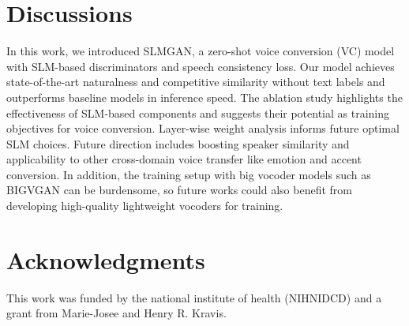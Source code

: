 \documentclass{article}
\let\oldbibitem\bibitem
\newcommand{\newfootnotesize}{\fontsize{8.5pt}{9pt}\selectfont}
\renewcommand{\bibitem}[1]{\oldbibitem{#1}\newfootnotesize}
\begin{document}
\begin{sloppy}
\section{Discussions}
\label{sec:discussions}
In this work, we introduced SLMGAN, a zero-shot voice conversion (VC) model with SLM-based discriminators and speech consistency loss. Our model achieves state-of-the-art naturalness and competitive similarity without text labels and outperforms baseline models in inference speed. The ablation study highlights the effectiveness of SLM-based components and suggests their potential as training objectives for voice conversion. Layer-wise weight analysis informs future optimal SLM choices. Future direction includes boosting speaker similarity and applicability to other cross-domain voice transfer like emotion and accent conversion. In addition, the training setup with big vocoder models such as BIGVGAN can be burdensome, so future works could also benefit from developing high-quality lightweight vocoders for training.

\section{Acknowledgments}
\label{sec:acknowledgments}
This work was funded by the national institute of health (NIHNIDCD) and a grant from Marie-Josee and Henry R. Kravis. %

\newpage


%
%
%
%
%
%
%
%
%


\end{sloppy}
\end{document}
